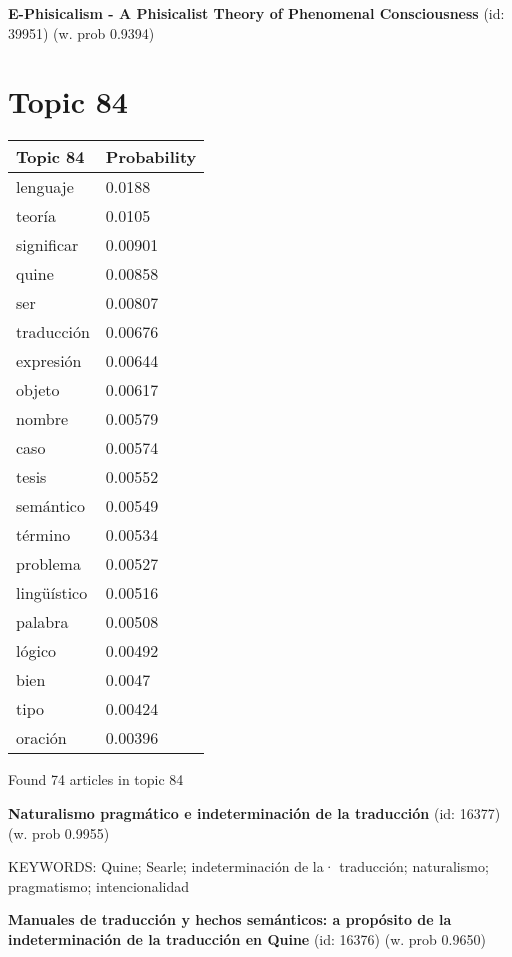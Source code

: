 \documentclass{article}
\begin{document}
\textbf{E-Phisicalism - A Phisicalist Theory of Phenomenal Consciousness} (id: 39951)
 (w. prob 0.9394)

\vfill
\newpage


\centering
\thispagestyle{empty}
\section*{Topic 84}\vfill
\begin{tabular}{ll}
\toprule
    Topic 84 & Probability \\
\midrule
    lenguaje &      0.0188 \\
      teoría &      0.0105 \\
  significar &     0.00901 \\
       quine &     0.00858 \\
         ser &     0.00807 \\
  traducción &     0.00676 \\
   expresión &     0.00644 \\
      objeto &     0.00617 \\
      nombre &     0.00579 \\
        caso &     0.00574 \\
       tesis &     0.00552 \\
   semántico &     0.00549 \\
     término &     0.00534 \\
    problema &     0.00527 \\
 lingüístico &     0.00516 \\
     palabra &     0.00508 \\
      lógico &     0.00492 \\
        bien &      0.0047 \\
        tipo &     0.00424 \\
     oración &     0.00396 \\
\bottomrule
\end{tabular}

\vfill
Found 74 articles in topic 84
\vfill

\textbf{Naturalismo pragmático e indeterminación de la traducción} (id: 16377)
 (w. prob 0.9955)


KEYWORDS:
Quine; Searle; indeterminación de la· traducción; naturalismo; pragmatismo; intencionalidad
\vfill

\textbf{Manuales de traducción y hechos semánticos: a propósito de la indeterminación de la traducción en Quine} (id: 16376)
 (w. prob 0.9650)
\end{document}
